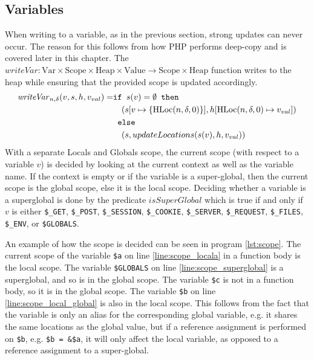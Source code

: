 \subsection{Variables}
When writing to a variable, as in the previous section, strong updates can never occur. The reason for this follows from how PHP performs deep-copy and is covered later in this chapter. The $\mathit{writeVar}: \text{Var} \times \text{Scope} \times \text{Heap} \times \text{Value} \rightarrow \text{Scope} \times \text{Heap}$ function writes to the heap while ensuring that the provided scope is updated accordingly. 
\begin{align}
\mathit{writeVar}_{n,\delta}(v,s,h,v_{val}) =  &\texttt{if }s(v) = \emptyset\texttt{ then } \notag\\
                            &\quad (s[v\mapsto\{\text{HLoc}(n,\delta, 0)\}],h[\text{HLoc}(n,\delta, 0)\mapsto v_{val}]) \notag\\
                            & \texttt{ else } \notag\\
                            &\quad (s, updateLocations(s(v), h, v_{val}))
\end{align}
With a separate Locals and Globals scope, the current scope (with respect to a variable $v$) is decided by looking at the current context as well as the variable name. If the context is empty or if the variable is a super-global, then the current scope is the global scope, else it is the local scope. Deciding whether a variable is a superglobal is done by the predicate $\mathit{isSuperGlobal}$ which is true if and only if $v$ is either \texttt{\$\_GET}, \texttt{\$\_POST}, \texttt{\$\_SESSION}, \texttt{\$\_COOKIE}, \texttt{\$\_SERVER}, \texttt{\$\_REQUEST}, \texttt{\$\_FILES}, \texttt{\$\_ENV}, or \texttt{\$GLOBALS}.

An example of how the scope is decided can be seen in program \ref{lst:scope}. The current scope of the variable \texttt{\$a} on line \ref{line:scope_locala} in a function body is the local scope. The variable \texttt{\$GLOBALS} on line \ref{line:scope_superglobal} is a superglobal, and so is in the global scope. The variable \texttt{\$c} is not in a function body, so it is in the global scope. The variable \texttt{\$b} on line \ref{line:scope_local_global} is also in the local scope. This follows from the fact that the variable is only an alias for the corresponding global variable, e.g. it shares the same locations as the global value, but if a reference assignment is performed on \texttt{\$b}, e.g. \texttt{\$b = \&\$a}, it will only affect the local variable, as opposed to a reference assignment to a super-global.

